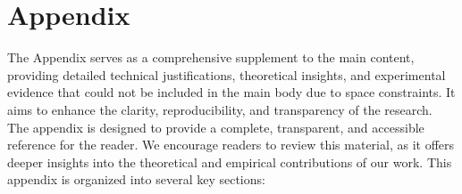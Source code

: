 








\appendix
\section{Appendix}
\label{sec:appendix}

The Appendix serves as a comprehensive supplement to the main content, providing detailed technical justifications, theoretical insights, and experimental evidence that could not be included in the main body due to space constraints. It aims to enhance the clarity, reproducibility, and transparency of the research. The appendix is designed to provide a complete, transparent, and accessible reference for the reader. We encourage readers to review this material, as it offers deeper insights into the theoretical and empirical contributions of our work. This appendix is organized into several key sections:



